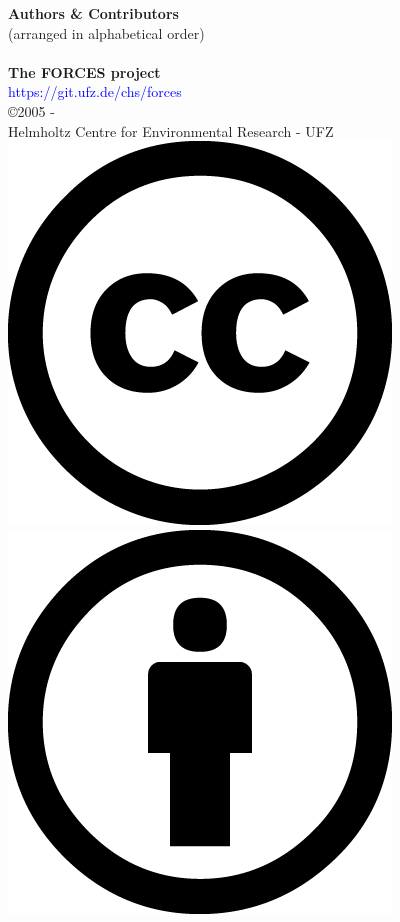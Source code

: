 \documentclass[twoside]{book}
\newcommand{\+}{\discretionary{\mbox{\scriptsize$\hookleftarrow$}}{}{}}
\begin{document}
\vspace*{2cm}
\begin{center}%
{\large \textbf{Authors \& Contributors}}\\
{(arranged in alphabetical order)}\\
\vspace*{0.5cm}
{\large }\\
\vfill{}
{\huge \textbf{The FORCES project}}\\
\textcolor{blue}{https://git.ufz.de/chs/forces}\\
\vspace*{0.5cm}
{\large \copyright 2005 - \the\year{}}\\
{\large Helmholtz Centre for Environmental Research - UFZ}\\
\vspace*{0.2cm}
\includegraphics[totalheight=5.mm]{../doc/figures/cc_large.png}\,%
\includegraphics[totalheight=5.mm]{../doc/figures/by_large.png}\,%

\end{center}
\end{document}
